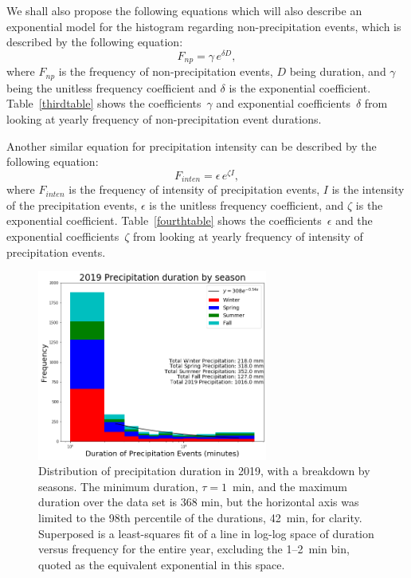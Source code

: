 \documentclass[11pt]{report}
\begin{document}
We shall also propose the following equations which will also describe an exponential model for the histogram regarding non-precipitation events, which is described by the following equation: 
\begin{equation}\label{expod_np}
	F_{np} = \gamma \,e^{\delta D},
\end{equation}
where $F_{np}$ is the frequency of non-precipitation events, $D$ being duration, and $\gamma $ being the unitless frequency coefficient and $\delta $ is the exponential coefficient. Table~\ref{thirdtable} shows the coefficients~$\gamma$ and exponential coefficients~$\delta$ from looking at yearly frequency of non-precipitation event durations. 

Another similar equation for precipitation intensity can be described by the following equation: 
\begin{equation}\label{expod_inten}
	F_{inten} = \epsilon \,e^{\zeta I},
\end{equation}
where $F_{inten}$ is the frequency of intensity of precipitation events, $I$ is the intensity of the precipitation events, $\epsilon$ is the unitless frequency coefficient, and $\zeta$ is the exponential coefficient. Table~\ref{fourthtable} shows the coefficients~$\epsilon$ and the exponential coefficients~$\zeta$ from looking at yearly frequency of intensity of precipitation events.  
\clearpage
\begin{figure}[t]
  \centering
  \includegraphics[width=0.675\textwidth]{Figures/More_detail_precip_2019.png}
  \caption[Precipitation histogram for 2019 broken down by
    season]{\label{p2019} Distribution of precipitation duration in
    2019, with a breakdown by seasons. The minimum duration,
    $\tau=1$~min, and the maximum duration over the data set is 368
    min, but the horizontal axis was limited to the 98th percentile of
    the durations, 42~min, for clarity. Superposed is a least-squares
    fit of a line in log-log space of duration versus frequency for
    the entire year, excluding the 1--2~min bin, quoted as the
    equivalent exponential in this space.}
\end{figure}
\end{document}
